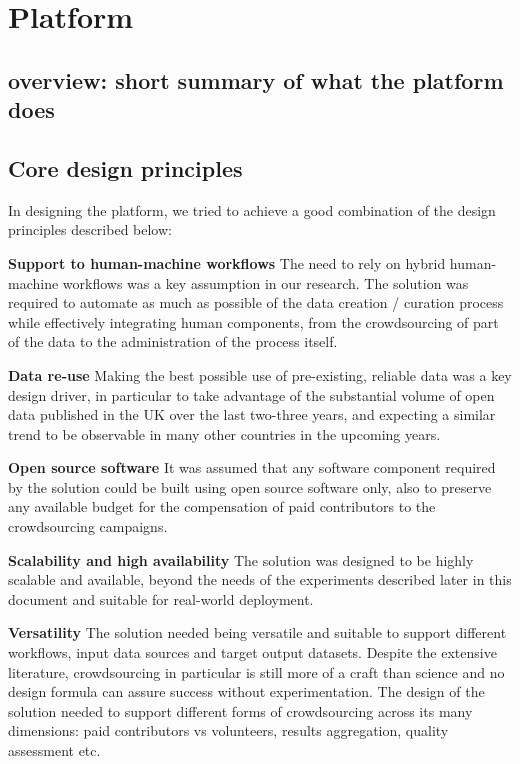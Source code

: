 \section{Platform}

\subsection{overview: short summary of what the platform does}

\subsection{Core design principles}

In designing the platform, we tried to achieve a good combination of the design principles described below:

\textbf{Support to human-machine workflows} The need to rely on hybrid human-machine workflows was a key assumption in our research. The solution was required to automate as much as possible of the data creation / curation process while effectively integrating human components, from the crowdsourcing of part of the data to the administration of the process itself.

\textbf{Data re-use} Making the best possible use of pre-existing, reliable data was a key design driver, in particular to take advantage of the substantial volume of open data published in the UK over the last two-three years, and expecting a similar trend to be observable in many other countries in the upcoming years.

\textbf{Open source software} It was assumed that any software component required by the solution could be built using open source software only, also to preserve any available budget for the compensation of paid contributors to the crowdsourcing campaigns.

\textbf{Scalability and high availability} The solution was designed to be highly scalable and available, beyond the needs of the experiments described later in this document and suitable for real-world deployment.

\textbf{Versatility} The solution needed being versatile and suitable to support different workflows, input data sources and target output datasets. Despite the extensive literature, crowdsourcing in particular is still more of a craft than science and no design formula can assure success without experimentation. The design of the solution needed to support different forms of crowdsourcing across its many dimensions: paid contributors vs volunteers, results aggregation, quality assessment etc.

